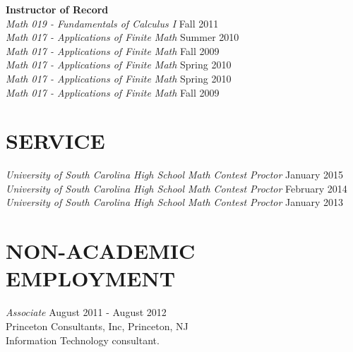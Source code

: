 \documentclass[line,overlapped]{res}
\begin{document}
\begin{resume}
                                                          {\bf Instructor of Record}\\
                                                          {\sl Math 019 - Fundamentals of Calculus I} \hfill Fall 2011\\
                                                          {\sl Math 017 - Applications of Finite Math} \hfill Summer 2010\\
                                                          {\sl Math 017 - Applications of Finite Math} \hfill Fall 2009\\
                                                          {\sl Math 017 - Applications of Finite Math} \hfill Spring 2010\\
                                                          {\sl Math 017 - Applications of Finite Math} \hfill Spring 2010\\
                                                          {\sl Math 017 - Applications of Finite Math} \hfill Fall 2009\\
                                                          \section{SERVICE}

                                                          {\sl University of South Carolina High School Math Contest Proctor} \hfill January 2015\\
                                                          {\sl University of South Carolina High School Math Contest Proctor} \hfill February 2014\\
                                                          {\sl University of South Carolina High School Math Contest Proctor} \hfill January 2013
                                                          
                                                          
                                                          \section{NON-ACADEMIC\\EMPLOYMENT}             
                                                                  {\sl Associate} \hfill August 2011 - August 2012\\
                                                                  Princeton Consultants, Inc, Princeton, NJ\\
                                                                  Information Technology consultant.


\end{resume}
\end{document}
